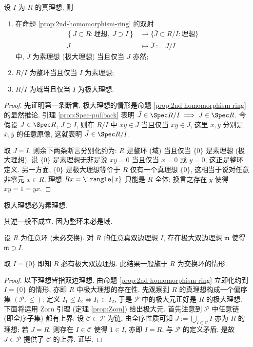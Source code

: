 \begin{proposition}\label{prop:prime-maximal-ideals}
	设 $I$ 为 $R$ 的真理想, 则
	\begin{enumerate}
		\item 在命题 \ref{prop:2nd-homomorphism-ring} 的双射
		\begin{align*}
			\left\{ J \subset R: \text{理想}, \; J \supset I \right\} & \longrightarrow \{ \bar{J} \subset R/I : \text{理想} \} \\
			J & \longmapsto \bar{J} := J/I
		\end{align*}
		中, $\bar{J}$ 为素理想 (极大理想) 当且仅当 $J$ 亦然;
		\item $R/I$ 为整环当且仅当 $I$ 为素理想;
		\item $R/I$ 为域当且仅当 $I$ 为极大理想.
	\end{enumerate}
\end{proposition}
\begin{proof}
	先证明第一条断言. 极大理想的情形是命题 \ref{prop:2nd-homomorphism-ring} 的显然推论. 引理 \ref{prop:Spec-pullback} 表明 $\bar{J} \in \Spec R/I \implies J \in \Spec R$. 今假设 $J \in \Spec R$, $J \supset I$, 则在 $R/I$ 中 $\bar{x}\bar{y} \in \bar{J}$ 当且仅当 $xy \in J$, 这里 $x,y$ 分别是 $\bar{x}, \bar{y}$ 的任意原像, 这就表明 $\bar{J} \in \Spec R/I$.

	取 $J=I$, 则余下两条断言分别化约为: $R$ 是整环 (域) 当且仅当 $\{0\}$ 是素理想 (极大理想). 说 $\{0\}$ 是素理想无非是说 $xy=0$ 当且仅当 $x=0$ 或 $y=0$, 这正是整环定义. 另一方面, $\{0\}$ 是极大理想等价于 $R$ 仅有一个真理想 $\{0\}$, 这相当于说对任意非零元 $x \in R$, 理想 $Rx = \lrangle{x}$ 只能是 $R$ 全体; 换言之存在 $y$ 使得 $xy=1=yx$.
\end{proof}

\begin{corollary}\label{prop:maximal-implies-prime}
	极大理想必为素理想.
\end{corollary}
其逆一般不成立, 因为整环未必是域.

\begin{proposition}\label{prop:existence-maximal-ideal}
	设 $R$ 为任意环 (未必交换). 对 $R$ 的任意真双边理想 $I$, 存在极大双边理想 $\mathfrak{m}$ 使得 $\mathfrak{m} \supset I$.
\end{proposition}
取 $I=\{0\}$ 即知 $R$ 必有极大双边理想. 此结果一般施于 $R$ 为交换环的情形.
\begin{proof}
	以下理想皆指双边理想. 由命题 \ref{prop:2nd-homomorphism-ring} 立即化约到 $I=\{0\}$ 的情形, 亦即 $R$ 中极大理想的存在性. 先观察到 $R$ 的真理想构成一个偏序集 $(\mathcal{P}, \leq)$: 定义 $I_1 \leq I_2 \iff I_1 \subset I_2$, 于是 $\mathcal{P}$ 中的极大元正好是 $R$ 的极大理想. 下面将运用 Zorn 引理 (定理 \ref{prop:Zorn}) 给出极大元. 首先注意到 $\mathcal{P}$ 中任意链 (即全序子集) 都有上界: 设 $\mathcal{C} \subset \mathcal{P}$ 为链, 由全序性质可知 $J := \bigcup_{I \in \mathcal{C}} I$ 亦为 $R$ 的理想; 若 $J = R$, 则存在 $I \in \mathcal{C}$ 使得 $1 \in I$, 亦即 $I = R$, 与 $\mathcal{P}$ 的定义矛盾. 是故 $J \in \mathcal{P}$ 提供了 $\mathcal{C}$ 的上界. 证毕.
\end{proof}

